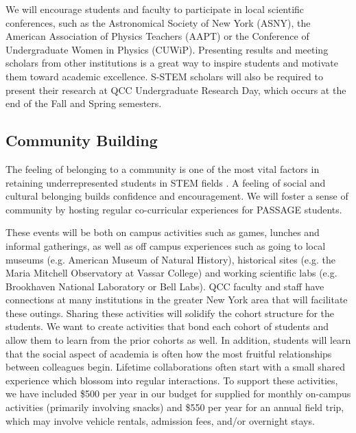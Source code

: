 \documentclass[12pt]{article}
\begin{document}
We will encourage students and faculty to participate in local scientific conferences, such as the Astronomical Society of New York (ASNY), the American Association of Physics Teachers (AAPT) or the Conference of Undergraduate Women in Physics (CUWiP).  Presenting results and meeting scholars from other institutions is a great way to inspire students and motivate them toward academic excellence.  S-STEM scholars will also be required to present their research at QCC Undergraduate Research Day, which occurs at the end of the Fall and Spring semesters.



\subsection{Community Building}
The feeling of belonging to a community is one of the most vital factors in retaining underrepresented students in STEM fields \citep{dyer14,Gonzales,Burrows}.  A feeling of social and cultural belonging builds confidence and encouragement.  We will foster a sense of community by hosting regular co-curricular experiences for PASSAGE students.  

These events will be both on campus activities such as games, lunches and informal gatherings, as well as off campus experiences such as going to local museums (e.g. American Museum of Natural History), historical sites (e.g. the Maria Mitchell Observatory at Vassar College) and working scientific labs (e.g. Brookhaven National Laboratory or Bell Labs). QCC faculty and staff have connections at many institutions in the greater New York area that will facilitate these outings.  Sharing these activities will solidify the cohort structure for the students.  We want to create activities that bond each cohort of students and allow them to learn from the prior cohorts as well.  In addition, students will learn that the social aspect of academia is often how the most fruitful relationships between colleagues begin.  Lifetime collaborations often start with a small shared experience which blossom into regular interactions.  To support these activities, we have included \$500 per year in our budget for supplied for monthly on-campus activities (primarily involving snacks) and \$550 per year for an annual field trip, which may involve vehicle rentals, admission fees, and/or overnight stays.
\end{document}
